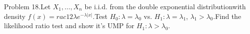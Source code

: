 \documentclass[preview]{standalone}
\begin{document}
\begin{center}
Problem 18.Let $X_1,\dots,X_n$ be i.i.d. from the double exponential distributionwith density $f(x)=rac12\lambda e^{-\lambda|x|}$.Test $H_0:\lambda=\lambda_0$ vs. $H_1:\lambda=\lambda_1$, $\lambda_1>\lambda_0$.Find the likelihood ratio test and show it's UMP for $H_1:\lambda>\lambda_0$.
\end{center}
\end{document}
